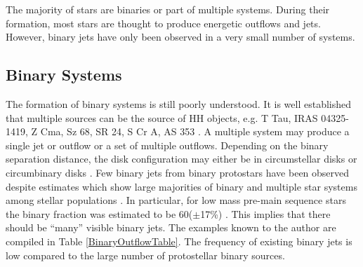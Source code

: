 The majority of stars are binaries or part of multiple systems.
During their formation, most stars are thought to produce energetic outflows and jets.
However, binary jets have only been observed in a very small number of systems.


\subsection{Binary Systems}

The formation of binary systems is still poorly understood. 
%
%
It is well established that multiple sources can be the source of HH objects, e.g. T Tau, IRAS 04325-1419, Z Cma, Sz 68, SR 24, S Cr A, AS 353 \citep{1993ApJ...408L..49R}.
A multiple system may produce a single jet or outflow or a set of multiple outflows.
Depending on the binary separation distance, the disk configuration may either be in circumstellar disks or circumbinary disks \citep{2000prpl.conf..841H}.
Few binary jets from binary protostars have been observed despite estimates which show large majorities of binary and multiple star systems among stellar populations \citep{2002ApJ...581..654P,1995ApJ...443..625S,1993AJ....106.2005G,1992ASPC...32...50Z,1991A&A...248..485D}.
In particular, for low mass pre-main sequence stars the binary fraction was estimated to be 60($\pm$17\%) \citep{1993AJ....106.2005G}.
This implies that there should be ``many'' visible binary jets. 
The examples known to the author are compiled in Table \ref{BinaryOutflowTable}.
The frequency of existing binary jets is low compared to the large number of protostellar binary
sources.  


%
%

